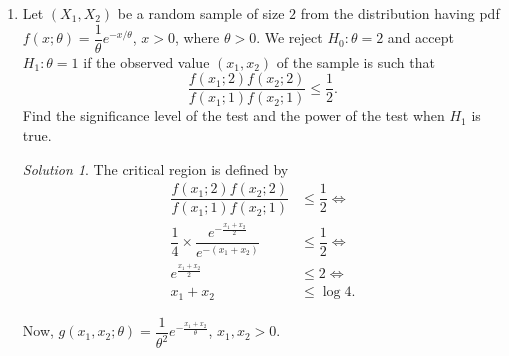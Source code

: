 \documentclass[svgnames, a5paper]{article}
\theoremstyle{definition}
\theoremstyle{remark}
\newtheorem*{Solution*}{Solution}
\begin{document}
\begin{enumerate}
\item Let $(X_1, X_2)$ be a random sample of size $2$ from the distribution having pdf $f(x; \theta) = \dfrac 1 \theta e^{-x/\theta}$, $x > 0$, where $\theta > 0$. We reject $H_0 \colon \theta = 2$ and accept $H_1 \colon \theta = 1$ if the observed value $(x_1, x_2)$ of the sample is such that
\begin{equation*}
\dfrac{f(x_1; 2) f(x_2; 2)}{f(x_1; 1) f(x_2; 1)} \le \dfrac 1 2.
\end{equation*}
Find the significance level of the test and the power of the test when $H_1$ is true.
\begin{Solution*}
The critical region is defined by
\begin{align*}
\dfrac{f(x_1; 2) f(x_2; 2)}{f(x_1; 1) f(x_2; 1)} & \le \dfrac 1 2 \iff \\
\dfrac 1 4 \times \dfrac{e^{-\frac{x_1 + x_2} 2}}{e^{-(x_1 + x_2)}} & \le \dfrac 1 2 \iff \\
e^{\frac {x_1 + x_2} 2} & \le 2 \iff\\
x_1 + x_2 & \le \log 4.
\end{align*}

Now, $g(x_1, x_2; \theta) = \dfrac 1 {\theta^2} e^{-\frac{x_1 + x_2}{\theta}}$, $x_1, x_2 > 0$.


\end{Solution*}
\end{enumerate}
\end{document}
